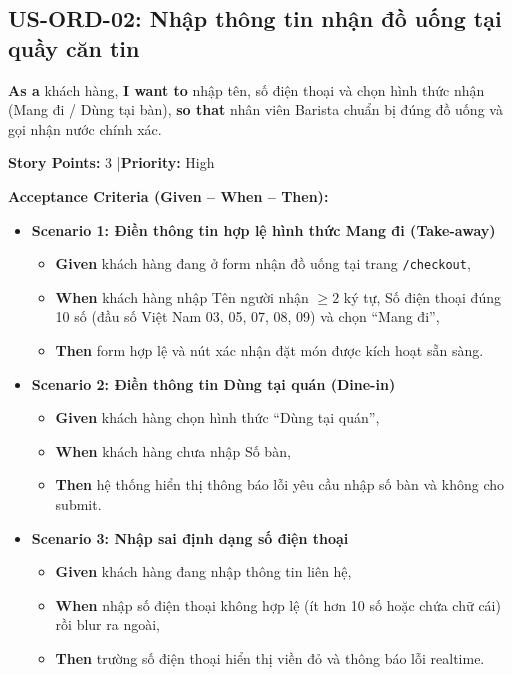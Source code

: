 \documentclass[12pt,a4paper]{article}
\begin{document}
\subsection{US-ORD-02: Nhập thông tin nhận đồ uống tại quầy căn tin}

\textbf{As a} khách hàng, \textbf{I want to} nhập tên, số điện thoại và chọn hình thức nhận (Mang đi / Dùng tại bàn), \textbf{so that} nhân viên Barista chuẩn bị đúng đồ uống và gọi nhận nước chính xác.

\textbf{Story Points:} 3 \quad|\quad \textbf{Priority:} High

\textbf{Acceptance Criteria (Given -- When -- Then):}
\begin{itemize}
  \item \textbf{Scenario 1: Điền thông tin hợp lệ hình thức Mang đi (Take-away)}
  \begin{itemize}
    \item \textbf{Given} khách hàng đang ở form nhận đồ uống tại trang \texttt{/checkout},
    \item \textbf{When} khách hàng nhập Tên người nhận $\geq 2$ ký tự, Số điện thoại đúng 10 số (đầu số Việt Nam 03, 05, 07, 08, 09) và chọn ``Mang đi'',
    \item \textbf{Then} form hợp lệ và nút xác nhận đặt món được kích hoạt sẵn sàng.
  \end{itemize}
  \item \textbf{Scenario 2: Điền thông tin Dùng tại quán (Dine-in)}
  \begin{itemize}
    \item \textbf{Given} khách hàng chọn hình thức ``Dùng tại quán'',
    \item \textbf{When} khách hàng chưa nhập Số bàn,
    \item \textbf{Then} hệ thống hiển thị thông báo lỗi yêu cầu nhập số bàn và không cho submit.
  \end{itemize}
  \item \textbf{Scenario 3: Nhập sai định dạng số điện thoại}
  \begin{itemize}
    \item \textbf{Given} khách hàng đang nhập thông tin liên hệ,
    \item \textbf{When} nhập số điện thoại không hợp lệ (ít hơn 10 số hoặc chứa chữ cái) rồi blur ra ngoài,
    \item \textbf{Then} trường số điện thoại hiển thị viền đỏ và thông báo lỗi realtime.
  \end{itemize}
\end{itemize}
\end{document}
